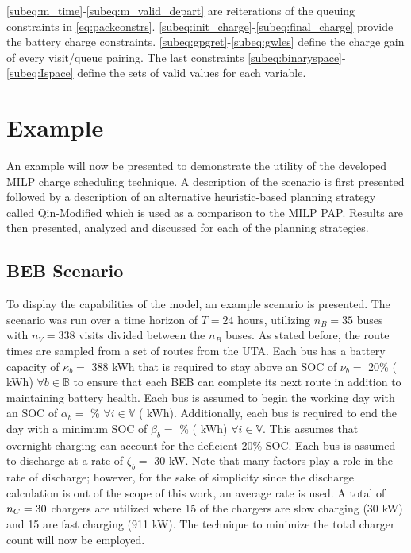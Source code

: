 \documentclass[utf8]{FrontiersinHarvard}
\newcommand{\A}{35 }                                                            %
\newcommand{\N}{338 }                                                           %
\newcommand{\acharge}{0.9}                                                      %
\newcommand{\bcharge}{0.7 }                                                     %
\newcommand{\mincharge}{20\% }                                                  %
\newcommand{\minchargeD}{0.20 }                                                 %
\newcommand{\batsize}{388 }                                                     %
\newcommand{\fast}{15 }                                                         %
\newcommand{\slow}{15 }                                                         %
\newcommand{\fasts}{911 }                                                       %
\newcommand{\slows}{30 }                                                        %
\begin{document}
\autoref{subeq:m_time}-\autoref{subeq:m_valid_depart} are reiterations of the queuing constraints in
\autoref{eq:packconstrs}. \autoref{subeq:init_charge}-\autoref{subeq:final_charge} provide the battery charge
constraints. \autoref{subeq:gpgret}-\autoref{subeq:gwles} define the charge gain of every visit/queue pairing. The last
constraints \autoref{subeq:binaryspace}-\autoref{subeq:Ispace} define the sets of valid values for each variable.
\section{Example}
\label{sec:example}
An example will now be presented to demonstrate the utility of the developed MILP charge scheduling technique. A
description of the scenario is first presented followed by a description of an alternative heuristic-based planning
strategy called Qin-Modified which is used as a comparison to the MILP PAP. Results are then presented,
analyzed and discussed for each of the planning strategies.

\subsection{BEB Scenario}
\label{beb-scenario}
To display the capabilities of the model, an example scenario is presented. The scenario was run over a time horizon of
\(T=24\) hours, utilizing \(n_B = \A\) buses with \(n_V = \N\) visits divided between the \(n_B\) buses. As stated before, the
route times are sampled from a set of routes from the UTA. Each bus has a battery capacity of \(\kappa_b =\) \batsize kWh that
is required to stay above an SOC of \(\nu_b =\) \mincharge (\fpeval{\batsize * \minchargeD} kWh) \(\forall b \in
\mathbb{B}\) to ensure that each BEB can complete its next route in addition to maintaining battery health. Each bus is
assumed to begin the working day with an SOC of \(\alpha_b =\) \fpeval{\acharge*100}\% \(\forall i \in \mathbb{V}\)
(\fpeval{\acharge * \batsize} kWh). Additionally, each bus is required to end the day with a minimum SOC of \(\beta_b =\)
\fpeval{\bcharge * 100}\% (\fpeval{\bcharge * \batsize} kWh) \(\forall i \in \mathbb{V}\). This assumes that overnight
charging can account for the deficient 20\% SOC. Each bus is assumed to discharge at a rate of \(\zeta_b =\) 30 kW. Note that
many factors play a role in the rate of discharge; however, for the sake of simplicity since the discharge calculation
is out of the scope of this work, an average rate is used. A total of \(n_C = \fpeval{\fast + \slow}\) chargers are
utilized where \slow of the chargers are slow charging (\slows kW) and \fast are fast charging (\fasts kW). The
technique to minimize the total charger count will now be employed.
\end{document}
